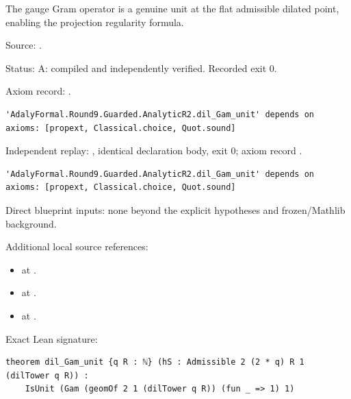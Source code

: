 \begin{theorem}[bp-090]
\label{bp-090}
\uses{}
\leanok
The gauge Gram operator is a genuine unit at the flat admissible dilated point, enabling the projection regularity formula.

\par Source: \texttt{}.
\par Status: A: compiled and independently verified. Recorded exit 0.
\par Axiom record: \texttt{}.
\begin{verbatim}
'AdalyFormal.Round9.Guarded.AnalyticR2.dil_Gam_unit' depends on axioms: [propext, Classical.choice, Quot.sound]
\end{verbatim}
\par Independent replay: \texttt{}, identical declaration body, exit 0; axiom record \texttt{}.
\begin{verbatim}
'AdalyFormal.Round9.Guarded.AnalyticR2.dil_Gam_unit' depends on axioms: [propext, Classical.choice, Quot.sound]
\end{verbatim}
\par Direct blueprint inputs: none beyond the explicit hypotheses and frozen/Mathlib background.
\par Additional local source references:
\begin{itemize}
\item \texttt{} at \texttt{}.
\item \texttt{} at \texttt{}.
\item \texttt{} at \texttt{}.
\end{itemize}
\par Exact Lean signature:
\begin{verbatim}
theorem dil_Gam_unit {q R : ℕ} (hS : Admissible 2 (2 * q) R 1 (dilTower q R)) :
    IsUnit (Gam (geomOf 2 1 (dilTower q R)) (fun _ => 1) 1)
\end{verbatim}
\end{theorem}


